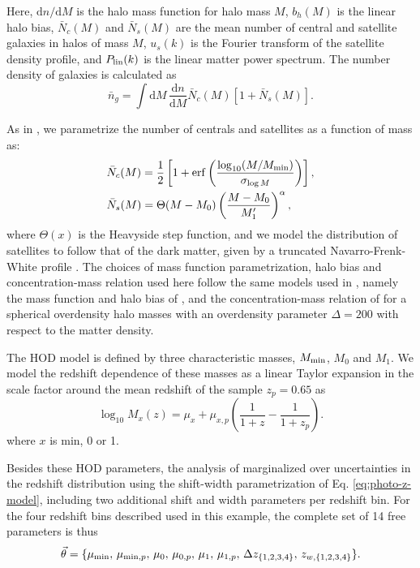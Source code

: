 \documentclass[a4paper,11pt]{article}
\begin{document}
      Here, $\mathrm{d}n/\mathrm{d}M$ is the halo mass function for halo mass $M$, $b_h(M)$ is the linear halo bias, $\bar{N}_c(M)$ and $\bar{N}_s(M)$ are the mean number of central and satellite galaxies in halos of mass $M$, $u_s(k)$ is the Fourier transform of the satellite density profile, and $P_{\rm lin}(k)$ is the linear matter power spectrum. The number density of galaxies is calculated as 
      \begin{equation}
        \bar{n}_g=\int \mathrm{d}M\,\frac{\mathrm{d}n}{\mathrm{d}M}\bar{N}_c(M)\left[1+\bar{N}_s(M)\right].
        \label{eq:ng_hod}
      \end{equation}    
    
      As in \cite{1912.08209}, we parametrize the number of centrals and satellites as a function of mass as:
      \begin{align}
        &\bar{N}_c(M)=\frac{1}{2}\left[1+{\rm erf}\left(\frac{\log_{10}(M/M_{\rm min})}{\sigma_{\log M}}\right)\right],\\
        &\bar{N}_s(M)=\Theta(M-M_0)\left(\frac{M-M_0}{M_1'}\right)^\alpha,
      \end{align}
      where $\Theta(x)$ is the Heavyside step function, and we model the distribution of satellites to follow that of the dark matter, given by a truncated Navarro-Frenk-White profile \cite{Navarro:1996}. The choices of mass function parametrization, halo bias and concentration-mass relation used here follow the same models used in \cite{1912.08209}, namely the mass function and halo bias of \cite{Tinker:2010}, and the concentration-mass relation of \cite{Duffy:2008} for a spherical overdensity halo masses with an overdensity parameter $\Delta=200$ with respect to the matter density.
 
      The HOD model is defined by three characteristic masses, $M_{\rm min}$, $M_0$ and $M_1$. We model the redshift dependence of these masses as a linear Taylor expansion in the scale factor around the mean redshift of the sample $z_p=0.65$ as
      \begin{equation}
        \log_{10}{M_x(z)} = \mu_x + \mu_{x, p} \left(\frac{1}{1+z} - \frac{1}{1+z_{p}}\right).
      \end{equation}
      where $x$ is $\mathrm{min}$, 0 or 1.
    
      Besides these HOD parameters, the analysis of \cite{1912.08209} marginalized over uncertainties in the redshift distribution using the shift-width parametrization of Eq. \ref{eq:photo-z-model}, including two additional shift and width parameters per redshift bin. For the four redshift bins described used in this example, the complete set of 14 free parameters is thus
      \begin{equation}
        \vec{\theta}=\{\mu_{\rm min},\,\mu_{{\rm min},p},\,\mu_0,\,\mu_{0,p},\,\mu_1,\,\mu_{1,p},\,\Delta z_{\{1,2,3,4\}},\,z_{w,\{1,2,3,4\}}\}.
      \end{equation}
\end{document}
